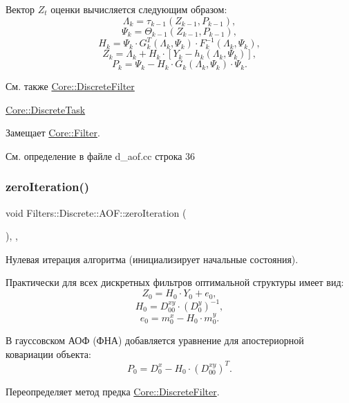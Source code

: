 Вектор $Z_t$ оценки вычисляется следующим образом\+: \[\Lambda_k = \tau_{k-1}(Z_{k-1}, P_{k-1}),\] \[\Psi_k = \Theta_{k-1}(Z_{k-1}, P_{k-1}),\] \[H_k = \Psi_k \cdot G_k^T(\Lambda_k, \Psi_k) \cdot F_k^{-1}(\Lambda_k, \Psi_k),\] \[Z_k = \Lambda_k + H_k \cdot [Y_k - h_k(\Lambda_k, \Psi_k)],\] \[P_k = \Psi_k - H_k \cdot G_k(\Lambda_k, \Psi_k) \cdot \Psi_k.\]

\begin{DoxySeeAlso}{См. также}
\hyperlink{class_core_1_1_discrete_filter}{Core\+::\+Discrete\+Filter} 

\hyperlink{class_core_1_1_discrete_task}{Core\+::\+Discrete\+Task} 
\end{DoxySeeAlso}


Замещает \hyperlink{class_core_1_1_filter_a438681ee3e54aba2148042d9f8011ab8}{Core\+::\+Filter}.



См. определение в файле d\+\_\+aof.\+cc строка 36

\hypertarget{class_filters_1_1_discrete_1_1_a_o_f_aa822fe74d7ca160f898db1c1289e17f7}{}\label{class_filters_1_1_discrete_1_1_a_o_f_aa822fe74d7ca160f898db1c1289e17f7} 
\subsubsection{\texorpdfstring{zero\+Iteration()}{zeroIteration()}}
{\footnotesize\ttfamily void Filters\+::\+Discrete\+::\+A\+O\+F\+::zero\+Iteration (\begin{DoxyParamCaption}{ }\end{DoxyParamCaption})\hspace{0.3cm}{\ttfamily [override]}, {\ttfamily [protected]}, {\ttfamily [virtual]}}



Нулевая итерация алгоритма (инициализирует начальные состояния). 

Практически для всех дискретных фильтров оптимальной структуры имеет вид\+: \[Z_0 = H_0 \cdot Y_0 + e_0,\] \[H_0 = D_{00}^{xy} \cdot (D_0^y)^{-1},\] \[e_0 = m_0^x - H_0 \cdot m_0^y.\]

В гауссовском АОФ (ФНА) добавляется уравнение для апостериорной ковариации объекта\+: \[P_0 = D_0^x - H_0 \cdot (D_{00}^{xy})^T.\] 

Переопределяет метод предка \hyperlink{class_core_1_1_discrete_filter_a658617c64c7067bb6b98b5e9d78f982e}{Core\+::\+Discrete\+Filter}.



